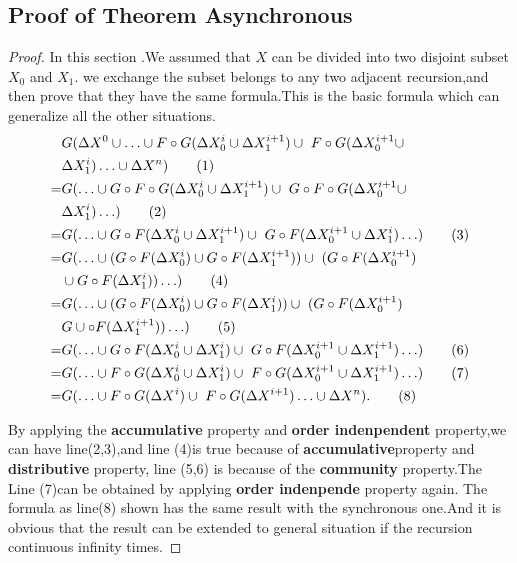 \begin{appendix}
\subsection{Proof of Theorem Asynchronous}
 \begin{proof}
 \label{sec:app:proof:correct}
 In this section .We assumed that $X$ can be divided into two disjoint subset $X_0$ and $X_1$. we exchange the subset belongs to any two adjacent recursion,and then prove that they have the same formula.This is the basic formula which can generalize all the other situations.
 \begin{align}
 &G(\Delta X^0\cup \ldots \cup F\circ G(\Delta X^{i}_0 \cup \Delta X^{i+1}_1)\cup\ F\circ G(\Delta X^{i+1}_0 \cup \notag\\ &\Delta X^{i}_1) \ldots\cup \Delta X^n)\tag{1} \\
 =&G( \ldots \cup G \circ F\circ G(\Delta X^{i}_0 \cup \Delta X^{{i+1}}_1)\cup\ G \circ F\circ G(\Delta X^{{i+1}}_0 \cup \notag\\ &\Delta X^{i}_1) \ldots)\tag{2} \\
 =&G( \ldots \cup G \circ F(\Delta X^{i}_0 \cup \Delta X^{{i+1}}_1)\cup\ G \circ F(\Delta X^{{i+1}}_0 \cup \Delta X^{{i}}_1) \ldots)\tag{3} \\
  =&G( \ldots \cup (G\circ F(\Delta X^{i}_0) \cup G\circ F(\Delta X^{{i+1}}_1))\cup\ (G \circ F(\Delta X^{{i+1}}_0) \notag\\ &\cup G \circ F(\Delta X^{i}_1)) \ldots )\tag{4} \\
  =&G( \ldots \cup (G\circ F(\Delta X^{i}_0) \cup G\circ F(\Delta X^{i}_1))\cup\ (G \circ F(\Delta X^{{i+1}}_0) \notag\\ &G \cup \circ F(\Delta X^{{i+1}}_1)) \ldots )\tag{5} \\
  =&G( \ldots \cup G \circ F(\Delta X^{i}_0 \cup \Delta X^{{i}}_1)\cup\ G \circ F(\Delta X^{{i+1}}_0 \cup \Delta X^{{i+1}}_1) \ldots)\tag{6} \\
  =&G( \ldots \cup F \circ G(\Delta X^{i}_0 \cup \Delta X^{{i}}_1)\cup\ F \circ G(\Delta X^{{i+1}}_0 \cup \Delta X^{{i+1}}_1) \ldots)\tag{7} \\
=&G(\ldots \cup F \circ G(\Delta X^i)\cup\ F \circ G(\Delta X^{i+1}) \ldots\cup \Delta X^n).\tag{8}
 \end{align}

By applying the \textbf{accumulative} property and \textbf{order indenpendent} property,we can have line(2,3),and line (4)is true because of \textbf{accumulative}property
and \textbf{distributive} property, line (5,6) is because of the \textbf{community} property.The Line (7)can be obtained by applying \textbf{order indenpende} property again.
The formula as line(8) shown has the same result with the synchronous one.And it is obvious that the result can be extended to general situation if the recursion continuous infinity times.
 \end{proof}

\end{appendix}
